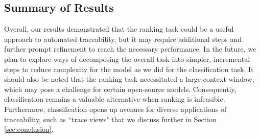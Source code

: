 \subsection{Summary of Results}
Overall, our results demonstrated that the ranking task could be a useful approach to automated traceability, but it may require additional steps and further prompt refinement to reach the necessary performance. In the future, we plan to explore ways of decomposing the overall task into simpler, incremental steps to reduce complexity for the model as we did for the classification task. It should also be noted that the ranking task necessitated a large context window, which may pose a challenge for certain open-source models. Consequently, classification remains a valuable alternative when ranking is infeasible. Furthermore, classification opens up avenues for diverse applications of traceability, such as ``trace views" that we discuss further in Section \ref{sec:conclusion}. 

